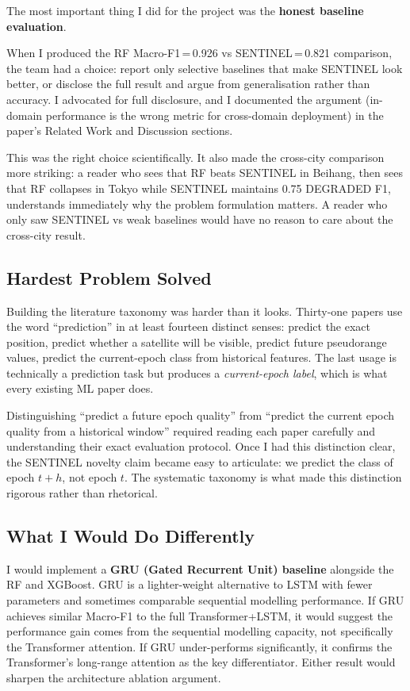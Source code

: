 \documentclass[12pt,a4paper]{article}
\begin{document}
The most important thing I did for the project was the \textbf{honest baseline evaluation}.

When I produced the RF Macro-F1\,=\,0.926 vs SENTINEL\,=\,0.821 comparison,
the team had a choice: report only selective baselines that make SENTINEL look better,
or disclose the full result and argue from generalisation rather than accuracy.
I advocated for full disclosure, and I documented the argument (in-domain performance
is the wrong metric for cross-domain deployment) in the paper's Related Work and
Discussion sections.

This was the right choice scientifically.
It also made the cross-city comparison more striking: a reader who sees that RF beats
SENTINEL in Beihang, then sees that RF collapses in Tokyo while SENTINEL maintains 0.75
DEGRADED F1, understands immediately why the problem formulation matters.
A reader who only saw SENTINEL vs weak baselines would have no reason to care about
the cross-city result.

\subsection{Hardest Problem Solved}

Building the literature taxonomy was harder than it looks.
Thirty-one papers use the word ``prediction'' in at least fourteen distinct senses:
predict the exact position, predict whether a satellite will be visible, predict
future pseudorange values, predict the current-epoch class from historical features.
The last usage is technically a prediction task but produces a \emph{current-epoch label},
which is what every existing ML paper does.

Distinguishing ``predict a future epoch quality'' from ``predict the current epoch quality
from a historical window'' required reading each paper carefully and understanding their
exact evaluation protocol.
Once I had this distinction clear, the SENTINEL novelty claim became easy to articulate:
we predict the class of epoch $t+h$, not epoch $t$.
The systematic taxonomy is what made this distinction rigorous rather than rhetorical.

\subsection{What I Would Do Differently}

I would implement a \textbf{GRU (Gated Recurrent Unit) baseline} alongside the RF and
XGBoost.
GRU is a lighter-weight alternative to LSTM with fewer parameters and sometimes
comparable sequential modelling performance.
If GRU achieves similar Macro-F1 to the full Transformer+LSTM, it would suggest the
performance gain comes from the sequential modelling capacity, not specifically the
Transformer attention.
If GRU under-performs significantly, it confirms the Transformer's long-range attention
as the key differentiator.
Either result would sharpen the architecture ablation argument.
\end{document}

